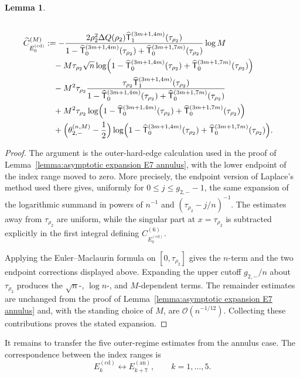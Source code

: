 \documentclass[a4paper]{article}
\newtheorem{lemma}[theorem]{Lemma}
\numberwithin{equation}{section}
\begin{document}
\begin{lemma}
\begin{align*}
\\
\widetilde{C}_{E_{0}^{(\mathrm{cd})}}^{(M)}
&:=
-\frac{2\rho_2^2\Delta Q(\rho_2)\widehat{\mathsf{T}}_{1}^{(3m+1,4m)}(\tau_{\rho_2})}{1-\widehat{\mathsf{T}}_0^{(3m+1,4m)}(\tau_{\rho_2})+\widehat{\mathsf{T}}_0^{(3m+1,7m)}(\tau_{\rho_2})}
\log M
\\
&\quad 
-M\tau_{\rho_2}\sqrt{n}
\log\Bigl(1-\widehat{\mathsf{T}}_0^{(3m+1,4m)}(\tau_{\rho_2})+\widehat{\mathsf{T}}_0^{(3m+1,7m)}(\tau_{\rho_2})\Bigr)
\\
&\quad 
-M^2\tau_{\rho_2}
\frac{\tau_{\rho_2}\widehat{\mathsf{T}}_1^{(3m+1,4m)}(\tau_{\rho_2})}{1-\widehat{\mathsf{T}}_0^{(3m+1,4m)}(\tau_{\rho_2})+\widehat{\mathsf{T}}_0^{(3m+1,7m)}(\tau_{\rho_2})}
\\
&\quad 
+M^2\tau_{\rho_2}
\log\Bigl(1-\widehat{\mathsf{T}}_0^{(3m+1,4m)}(\tau_{\rho_2})+\widehat{\mathsf{T}}_0^{(3m+1,7m)}(\tau_{\rho_2})\Bigr)
\\
&\quad 
+\Bigl(\theta_{2,-}^{(n,M)}-\frac{1}{2}\Bigr)
\log\Bigl(1-\widehat{\mathsf{T}}_0^{(3m+1,4m)}(\tau_{\rho_2})+\widehat{\mathsf{T}}_0^{(3m+1,7m)}(\tau_{\rho_2})\Bigr). 
\end{align*}
\end{lemma}

\begin{proof}
The argument is the outer-hard-edge calculation used in the proof of
Lemma~\ref{lemma:asymptotic expansion E7 annulus}, with the lower endpoint of
the index range moved to zero.  More precisely, the endpoint version of
Laplace's method used there gives, uniformly for
$0\leq j\leq g_{2,-}-1$, the same expansion of the logarithmic summand in
powers of $n^{-1}$ and $(\tau_{\rho_2}-j/n)^{-1}$.  The estimates away from
$\tau_{\rho_2}$ are uniform, while the singular part at
$x=\tau_{\rho_2}$ is subtracted explicitly in the first integral defining
$C_{E_0^{(\mathrm{cd})}}^{(6)}$.

Applying the Euler--Maclaurin formula on $[0,\tau_{\rho_2}]$ gives the
$n$-term and the two endpoint corrections displayed above.  Expanding the
upper cutoff $g_{2,-}/n$ about $\tau_{\rho_2}$ produces the
$\sqrt n$-, $\log n$-, and $M$-dependent terms.  The remainder estimates are
unchanged from the proof of Lemma~\ref{lemma:asymptotic expansion E7 annulus}
and, with the standing choice of $M$, are
$\mathcal{O}(n^{-1/12})$.  Collecting these contributions proves the stated
expansion.
\end{proof}

It remains to transfer the five outer-regime estimates from the annulus
case.  The correspondence between the index ranges is
\[
E_k^{(\mathrm{cd})}\longleftrightarrow E_{k+7}^{(\mathrm{an})},
\qquad k=1,\dots,5.
\]
\end{document}
